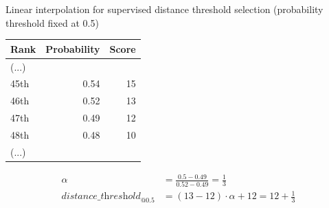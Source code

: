\begin{example}
  \centering
  \caption{Linear interpolation for supervised distance threshold selection (probability threshold fixed at 0.5)}
  \label{ex:linear_interpolation}

  \begin{subexample}{\linewidth}
    \centering
    \begin{tabular}{l r r}
      \toprule
      Rank & Probability & Score \\
      \midrule
      (...) & &\\
      45th & 0.54 & 15 \\
      46th & 0.52 & 13 \\
      47th & 0.49 & 12 \\
      48th & 0.48 & 10 \\
      (...) & & \\
      \bottomrule
    \end{tabular}
  \end{subexample}

  \vspace{0.5cm}

  \begin{subexample}{\linewidth}
    \centering
    \begin{align}
        \alpha &= \frac{0.5 - 0.49}{0.52 - 0.49} = \frac{1}{3} \\
        \textit{distance\_threshold}_{@0.5} &= (13 - 12) \cdot \alpha + 12 = 12 + \frac{1}{3}
    \end{align}
  \end{subexample}

\end{example}
